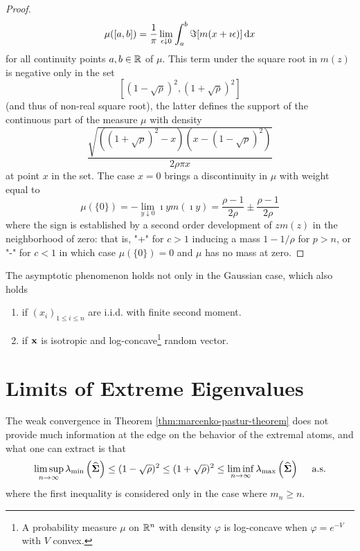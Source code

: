 \begin{proof}
	\begin{equation*}
		\mu([a,b])=\frac{1}{\pi}\lim_{\epsilon\downarrow 0}\int_{a}^{b}\Im[m(x+\imath\epsilon)]\mathop{}\!\mathrm{d} x
	\end{equation*}
	for all continuity points $a,b\in{\mathbb R}$ of $\mu$. This term under the square root in $m(z)$ is negative only in the set
	\begin{equation*}
		\left[(1-\sqrt{\rho})^{2},(1+\sqrt{\rho})^{2}\right]
	\end{equation*}
	(and thus of non-real square root), the latter defines the support of the continuous part of the measure $\mu$ with density
	\begin{equation*}
		\frac{\sqrt{\left((1+\sqrt{\rho})^{2}-x\right)\left(x-(1-\sqrt{\rho})^{2}\right)}}{2\rho\pi x}
	\end{equation*}
	at point $x$ in the set. The case $x=0$ brings a discontinuity in $\mu$ with weight equal to
	\begin{equation*}
		\mu(\{0\})=-\lim_{y\downarrow 0}\imath ym(\imath y)=\frac{\rho-1}{2\rho}\pm\frac{\rho-1}{2\rho}
	\end{equation*}
	where the sign is established by a second order development of $z m(z)$ in the neighborhood of zero: that is, "+" for $c>1$ inducing a mass $1-1/\rho$ for $p>n$, or "-" for $c<1$ in which case $\mu(\{0\})=0$ and $\mu$ has no mass at zero.
\end{proof}

\begin{remark}
	The asymptotic phenomenon holds not only in the Gaussian case, which also holds
	\begin{enumerate}
		\item if $\left(x_{i}\right)_{1\leq i\leq n}$ are i.i.d. with finite second moment.
		\item if ${\bf x}$ is isotropic and log-concave\footnote{A probability measure $\mu$ on ${\mathbb R}^{n}$ with density $\varphi$ is log-concave when $\varphi=e^{-V}$ with $V$ convex.} random vector.
	\end{enumerate}
\end{remark}

\section{Limits of Extreme Eigenvalues}

The weak convergence in Theorem \ref{thm:marcenko-pastur-theorem} does not provide much information at the edge on the behavior of the extremal atoms, and what one can extract is that
\begin{equation}
	\limsup_{n\rightarrow\infty}\lambda_{\min}\left(\widehat{\boldsymbol{\Sigma}}\right)\leq(1-\sqrt{\rho})^{2}\leq(1+\sqrt{\rho})^{2}\leq\liminf_{n\rightarrow\infty}\lambda_{\max}\left(\widehat{\boldsymbol{\Sigma}}\right)\quad\text{ a.s.}
\end{equation}
where the first inequality is considered only in the case where $m_{n}\geq n$.

